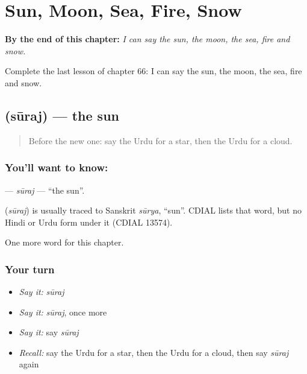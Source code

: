 
\chapter{Sun, Moon, Sea, Fire, Snow}
\label{ch:ur-sun-moon-sea-fire-snow}

\begin{chapteropening}
\textbf{By the end of this chapter:} \emph{I can say the sun, the moon, the sea, fire and snow.}

Complete the last lesson of chapter 66: I can say the sun, the moon, the sea, fire and snow.
\end{chapteropening}

\section[\texorpdfstring{\ur{سورج} (sūraj)}{سورج (sūraj)}]{ (sūraj) — the sun}

\label{lesson:UR-C66-suraj}



\begin{quote}
Before the new one: say the Urdu for a star, then the Urdu for a cloud.
\end{quote}

\subsection*{You'll want to know: }
\textbf{} — \emph{sūraj} — \textquotedblleft{}the sun\textquotedblright{}.

\begin{cousinweb}
\textbf{} (\emph{sūraj}) is usually traced to Sanskrit \emph{sūrya}, \textquotedblleft{}sun\textquotedblright{}. CDIAL lists that word, but no Hindi or Urdu form under it (CDIAL 13574).
\end{cousinweb}

\begin{grammarlens}[title={What you've built}]
One more word for this chapter.
\end{grammarlens}

\subsection*{Your turn}
\begin{itemize}
\raggedright
  \item \emph{Say it:} \emph{sūraj}
  \item \emph{Say it:} \emph{sūraj}, once more
  \item \emph{Say it:} say \emph{sūraj}
  \item \emph{Recall:} say the Urdu for a star, then the Urdu for a cloud, then say \emph{sūraj} again
\end{itemize}

